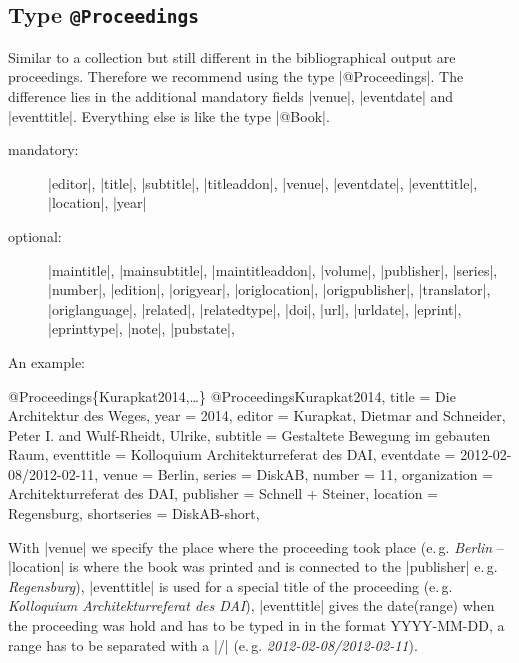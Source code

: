 \documentclass[a4paper,
10pt,
greek,
french,
spanish,
italian,
ngerman,
english
]{ltxdoc}
\begin{document}
\subsection{Type \texttt{@Proceedings}}\label{proceedings}
Similar to a collection but still different in the bibliographical output are proceedings.
Therefore we recommend  using the type |@Proceedings|.
The difference lies in the additional mandatory fields |venue|, |eventdate| and |eventtitle|. 
Everything else is like the type |@Book|.

\begin{description}
\item[mandatory:] 
|editor|, 
|title|, |subtitle|, |titleaddon|,
|venue|, |eventdate|, |eventtitle|,
|location|, |year|
\item[optional:]
|maintitle|, |mainsubtitle|, |maintitleaddon|, |volume|, 
|publisher|, |series|, |number|, |edition|, 
|origyear|, |origlocation|, |origpublisher|, 
|translator|, |origlanguage|,
|related|, |relatedtype|,
|doi|, |url|, |urldate|, |eprint|, |eprinttype|, |note|, |pubstate|, 
 \end{description}
 
An example:
 \begin{bibexample}[label=Kurapkat2014]{{@}Proceedings\{Kurapkat2014,…\}}
@Proceedings{Kurapkat2014,
  title        = {Die Architektur des Weges},
  year         = {2014},
  editor       = {Kurapkat, Dietmar and Schneider, Peter I. and Wulf-Rheidt, Ulrike},
  subtitle     = {Gestaltete Bewegung im gebauten Raum},
  eventtitle   = {Kolloquium Architekturreferat des DAI},
  eventdate    = {2012-02-08/2012-02-11},
  venue        = Berlin,     %
  series       = DiskAB,    %
  number       = {11},
  organization = {Architekturreferat des DAI},
  publisher    = {Schnell + Steiner},
  location     = Regensburg,     %
  shortseries  = DiskAB-short,    %
}
\end{bibexample}
With |venue| we specify the place where the proceeding took place 
(e.\,g. \emph{Berlin} -- |location| is where the book was printed and is connected 
to the |publisher| e.\,g. \emph{Regensburg}),
|eventtitle| is used for a special title of the proceeding (e.\,g. \emph{Kolloquium Architekturreferat des DAI}),
|eventtitle| gives the date(range) when the proceeding was hold and has to be typed in in the format YYYY-MM-DD, 
a range has to be separated with a |/| (e.\,g.  \emph{2012-02-08/2012-02-11}).
\end{document}
